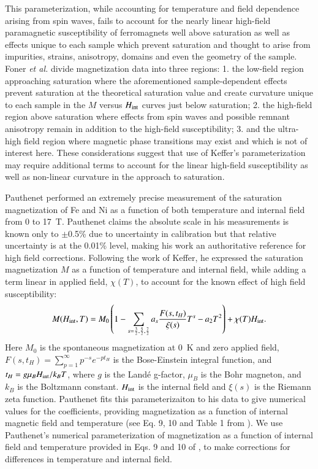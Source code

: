 \documentclass[preprint,12pt]{elsarticle}
\begin{document}
This parameterization, while accounting for temperature and field dependence arising from spin waves, fails to account for the nearly linear high-field paramagnetic susceptibility of ferromagnets well above saturation as well as effects unique to each sample which prevent saturation and thought to arise from impurities,  strains, anisotropy, domains and even the geometry of the sample\cite{Foner1969}. Foner {\it et al.} divide magnetization data into three regions: 1. the low-field region approaching saturation where the aforementioned sample-dependent effects prevent saturation at the theoretical saturation value and create curvature unique to each sample in the $M$ versus $H_{\rm{int}}$ curves just below saturation; 2. the high-field region above saturation where effects from spin waves and possible remnant anisotropy remain in addition to the high-field susceptibility; 3. and the ultra-high field region where magnetic phase transitions may exist and which is not of interest here\cite{Foner1969}. These considerations suggest that use of Keffer's parameterization may require additional terms to account for the linear high-field susceptibility as well as non-linear curvature in the approach to saturation. 

Pauthenet performed an extremely precise measurement of the saturation magnetization of Fe and Ni as a function of both temperature and internal field from 0 to 17~T. Pauthenet claims the absolute scale in his measurements is known only to $\pm$0.5\% due to uncertainty in calibration but that relative uncertainty is at the 0.01\% level, making his work an authoritative reference for high field corrections. Following the work of Keffer, he expressed the saturation magnetization $M$ as a function of temperature and internal field, while adding a term linear in applied field, $\chi(T)$, to account for the known effect of high field susceptibility:\cite{Keffer1966,PauthenetMar1982,PauthenetNov1982}
\begin{equation}
M(H_{\rm int}, T)=M_0\left(1-\sum_{s=\frac{3}{2},\frac{5}{2},\frac{7}{2}}a_s\frac{F(s,t_H)}{\xi(s)}T^s-a_2T^2\right) +\chi(T)H_{\rm int}.
\label{eq:pauthenet}
\end{equation}
Here $M_0$ is the spontaneous magnetization at 0~K and zero applied field, $F(s,t_H)=\sum_{p=1}^\infty p^{-s}e^{-pt_H}$ is the Bose-Einstein integral function, and $t_H=g\mu_BH_{\rm int}/k_BT$, where $g$ is the Land\'e g-factor, $\mu_B$ is the Bohr magneton, and $k_B$ is the Boltzmann constant. $H_{\rm int}$ is the internal field and  $\xi(s)$ is the Riemann zeta function. Pauthenet fits this parameterizaiton to his data to give numerical values for the coefficients, providing magnetization as a function of internal magnetic field and temperature (see Eq. 9, 10 and Table 1 from \cite{PauthenetMar1982}). We use Pauthenet's numerical parameterization of magnetization as a function of internal field and temperature provided in Eqs. 9 and 10 of \cite{PauthenetMar1982}, to make corrections for differences in temperature and internal field.
\end{document}

